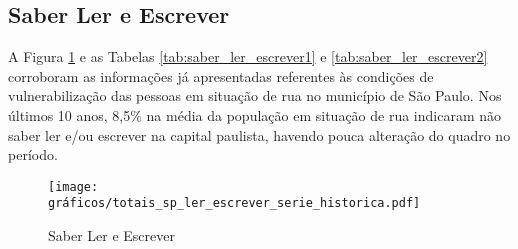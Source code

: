 \documentclass[14pt]{extarticle}
\begin{document}
\subsection{Saber Ler e Escrever}

A Figura \ref{fig:ler_escrever} e as Tabelas \ref{tab:saber_ler_escrever1} e \ref{tab:saber_ler_escrever2} corroboram as informações já apresentadas referentes às condições de vulnerabilização das pessoas em situação de rua no município de São Paulo. Nos últimos 10 anos, 8,5\% na média da população em situação de rua indicaram não saber ler e/ou escrever na capital paulista, havendo pouca alteração do quadro no período.\\

\begin{figure}[H]
\centering
	\caption{Saber Ler e Escrever}
	\texttt{[image: gráficos/totais\_sp\_ler\_escrever\_serie\_historica.pdf]}
	\label{fig:ler_escrever}
\end{figure}

\end{document}
